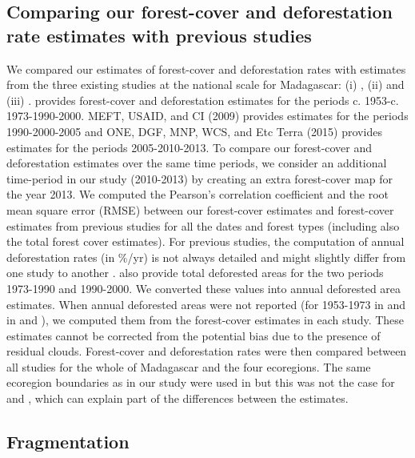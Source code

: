 \documentclass[a4paper, 12pt, leqno]{article} %
\begin{document}
\subsection{Comparing our forest-cover and deforestation rate
estimates with previous studies}

We compared our estimates of forest-cover and deforestation rates with
estimates from the three existing studies at the national scale for
Madagascar: (i) \citep{Harper2007}, (ii) \citep{MEFT2009} and (iii)
\citep{ONE2015}. \citet{Harper2007} provides forest-cover and
deforestation estimates for the periods
c. 1953-c. 1973-1990-2000. MEFT, USAID, and CI (2009) provides
estimates for the periods 1990-2000-2005 and ONE, DGF, MNP, WCS, and
Etc Terra (2015) provides estimates for the periods 2005-2010-2013. To
compare our forest-cover and deforestation estimates over the same
time periods, we consider an additional time-period in our study
(2010-2013) by creating an extra forest-cover map for the year
2013. We computed the Pearson's correlation coefficient and the root
mean square error (RMSE) between our forest-cover estimates and
forest-cover estimates from previous studies for all the dates and
forest types (including also the total forest cover estimates). For
previous studies, the computation of annual deforestation rates (in
\%/yr) is not always detailed and might slightly differ from one study
to another \citep[see][]{Puyravaud2003}. \citet{Harper2007} also
provide total deforested areas for the two periods 1973-1990 and
1990-2000. We converted these values into annual deforested area
estimates. When annual deforested areas were not reported (for
1953-1973 in \citet{Harper2007} and in \citet{MEFT2009} and
\citet{ONE2015}), we computed them from the forest-cover estimates in
each study. These estimates cannot be corrected from the potential
bias due to the presence of residual clouds. Forest-cover and
deforestation rates were then compared between all studies for the
whole of Madagascar and the four ecoregions. The same ecoregion
boundaries as in our study were used in \citet{ONE2015} but this was
not the case for \citet{Harper2007} and \citet{MEFT2009}, which can
explain part of the differences between the estimates.

\subsection{Fragmentation}
\end{document}
